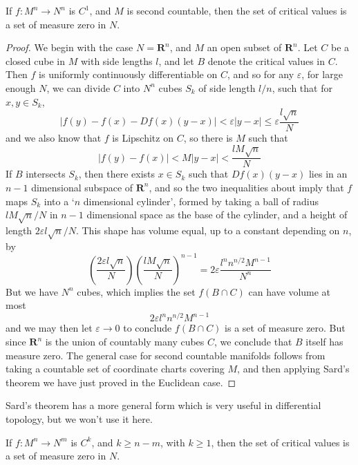 \begin{theorem}[Sard]
    If $f: M^n \to N^n$ is $C^1$, and $M$ is second countable, then the set of critical values is a set of measure zero in $N$.
\end{theorem}
\begin{proof}
    We begin with the case $N = \mathbf{R}^n$, and $M$ an open subset of $\mathbf{R}^n$. Let $C$ be a closed cube in $M$ with side lengths $l$, and let $B$ denote the critical values in $C$. Then $f$ is uniformly continuously differentiable on $C$, and so for any $\varepsilon$, for large enough $N$, we can divide $C$ into $N^n$ cubes $S_k$ of side length $l/n$, such that for $x,y \in S_k$,
    \[ |f(y) - f(x) - Df(x)(y - x)| < \varepsilon |y - x| \leq \varepsilon \frac{l \sqrt{n}}{N} \]
    and we also know that $f$ is Lipschitz on $C$, so there is $M$ such that
    \[ |f(y) - f(x)| < M|y - x| < \frac{lM \sqrt{n}}{N} \]
    If $B$ intersects $S_k$, then there exists $x \in S_k$ such that $Df(x)(y-x)$ lies in an $n-1$ dimensional subspace of $\mathbf{R}^n$, and so the two inequalities about imply that $f$ maps $S_k$ into a `$n$ dimensional cylinder', formed by taking a ball of radius $lM \sqrt{n}/N$ in $n-1$ dimensional space as the base of the cylinder, and a height of length $2 \varepsilon l\sqrt{n}/N$. This shape has volume equal, up to a constant depending on $n$, by
    \[ \left( \frac{2 \varepsilon l \sqrt{n}}{N} \right) \left( \frac{lM \sqrt{n}}{N} \right)^{n-1} = 2 \varepsilon \frac{l^n n^{n/2} M^{n-1}}{N^n} \]
    But we have $N^n$ cubes, which implies the set $f(B \cap C)$ can have volume at most
    \[ 2 \varepsilon l^n n^{n/2} M^{n-1} \]
    and we may then let $\varepsilon \to 0$ to conclude $f(B \cap C)$ is a set of measure zero. But since $\mathbf{R}^n$ is the union of countably many cubes $C$, we conclude that $B$ itself has measure zero. The general case for second countable manifolds follows from taking a countable set of coordinate charts covering $M$, and then applying Sard's theorem we have just proved in the Euclidean case.
\end{proof}

Sard's theorem has a more general form which is very useful in differential topology, but we won't use it here.

\begin{theorem}[Sard]
    If $f: M^n \to N^m$ is $C^k$, and $k \geq n-m$, with $k \geq 1$, then the set of critical values is a set of measure zero in $N$.
\end{theorem}

